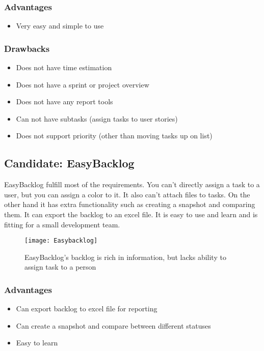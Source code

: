 \documentclass{report}
\begin{document}
\subsubsection{Advantages}
\begin{itemize}
\item Very easy and simple to use
\end{itemize}

\subsubsection{Drawbacks}
\begin{itemize}
\item Does not have time estimation
\item Does not have a sprint or project overview
\item Does not have any report tools
\item Can not have subtasks (assign tasks to user stories)
\item Does not support priority (other than moving tasks up on list)
\end{itemize}

\newpage
\subsection{Candidate: EasyBacklog}
EasyBacklog\cite{website:easybacklog} fulfill most of the requirements. You can’t directly assign a task to a user, but you can assign a color to it. It also can’t attach files to tasks. On the other hand it has extra functionality such as creating a snapshot and comparing them. It can export the backlog to an excel file. It is easy to use and learn and is fitting for a small development team.

\begin{figure}[H]
    \centering
    \texttt{[image: Easybacklog]}
    \caption{EasyBacklog's backlog is rich in information, but lacks ability to assign task to a person}  
    \label{fig:Easybacklog}
\end{figure}

\subsubsection{Advantages}
\begin{itemize}
\item Can export backlog to excel file for reporting
\item Can create a snapshot and compare between different statuses
\item Easy to learn
\end{itemize}
\end{document}
